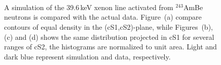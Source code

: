 
\appendix*

\section{}

\begin{figure}[h!]
	 \\
	\caption{A simulation of the 39.6\,keV  xenon line activated from $^{243}$AmBe neutrons is compared with the actual data.
		 Figure~(a) compare contours of equal density in the (cS1,cS2)-plane, while Figures~(b), (c) and (d) shows the same distribution projected in cS1 for
		 several ranges of cS2, the histograms are normalized to unit area. Light and dark blue represent simulation and data, respectively.
		}
		
  \label{fig:mc_comp}
\end{figure}

